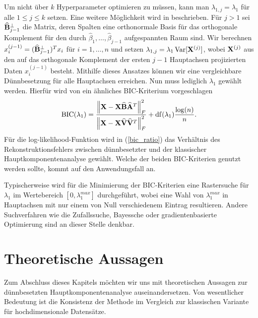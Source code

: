 Um nicht über $k$ Hyperparameter optimieren zu müssen, kann man $\lambda_{1,j} = \lambda_1$ für alle $1 \leq j \leq k$ setzen. Eine weitere Möglichkeit wird in \cite{croux} beschrieben. Für $j>1$ sei $\mathbf{\widehat{B}}_{j-1}^{\perp}$ die Matrix, deren Spalten eine orthonormale Basis für das orthogonale Komplement für den durch $\widehat{\beta}_1, \ldots, \widehat{\beta}_{j-1}$ aufgespannten Raum sind. Wir berechnen $x_i^{(j-1)} = (\mathbf{\widehat{B}}_{j-1}^{\perp})^T x_i$ für $i = 1, \ldots, n$ und setzen $\lambda_{1,j} = \lambda_1\operatorname{Var}[\mathbf{X}^{(j)}]$, wobei $\mathbf{X}^{(j)}$ aus den auf das orthogonale Komplement der ersten $j-1$ Hauptachsen projizierten Daten $x_i^{(j-1)}$ besteht. Mithilfe dieses Ansatzes können wir eine vergleichbare Dünnbesetzung für alle Hauptachsen erreichen. Nun muss lediglich $\lambda_1$ gewählt werden. Hierfür wird von \cite{croux, guo} ein ähnliches BIC-Kriterium vorgeschlagen
\begin{align}
\label{bic_ratio}
\operatorname{BIC}(\lambda_1) = \frac{\left\lVert \mathbf{X} - \mathbf{X} \widehat{\mathbf{B}} \widehat{\mathbf{A}}^T \right\rVert_{F}^{2}}{\left\lVert \mathbf{X} - \mathbf{X} \widehat{\mathbf{V}} \widehat{\mathbf{V}}^T \right\rVert_{F}^{2}} + \operatorname{df}(\lambda_1) \frac{\log(n)}{n}.
\end{align}
Für die log-likelihood-Funktion wird in (\ref{bic_ratio}) das Verhältnis des Rekonstruktionsfehlers zwischen dünnbesetzter und der klassischer Hauptkomponentenanalyse gewählt. Welche der beiden BIC-Kriterien genutzt werden sollte, kommt auf den Anwendungsfall an.

Typischerweise wird für die Minimierung der BIC-Kriterien eine Rastersuche für $\lambda_1$ im Wertebereich $[0, \lambda_1^{max}]$ durchgeführt, wobei eine Wahl von $\lambda_1^{max}$ in Hauptachsen mit nur einem von Null verschiedenem Eintrag resultieren. Andere Suchverfahren wie die Zufallssuche, Bayessche oder gradientenbasierte Optimierung sind an dieser Stelle denkbar. 




\section{Theoretische Aussagen} 
\label{spca_theorems}


Zum Abschluss dieses Kapitels möchten wir uns mit theoretischen Aussagen zur dünnbesetzten Hauptkomponentenanalyse auseinandersetzen. Von wesentlicher Bedeutung ist die Konsistenz der Methode im Vergleich zur klassischen Variante für hochdimensionale Datensätze.

